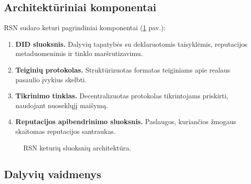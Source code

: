 \documentclass[11pt,a4paper,twocolumn]{article}
\begin{document}
\subsection{Architektūriniai komponentai}

RSN sudaro keturi pagrindiniai komponentai (\ref{fig:architecture} pav.):
\begin{enumerate}[nosep]
\item \textbf{DID sluoksnis.} Dalyvių tapatybės su deklaruotomis taisyklėmis, reputacijos metaduomenimis ir tinklo maršrutizavimu.
\item \textbf{Teiginių protokolas.} Struktūrizuotas formatas teiginiams apie realaus pasaulio įvykius skelbti.
\item \textbf{Tikrinimo tinklas.} Decentralizuotas protokolas tikrintojams priskirti, naudojant nuoseklųjį maišymą.
\item \textbf{Reputacijos apibendrinimo sluoksnis.} Paslaugos, kuriančios žmogaus skaitomas reputacijos santraukas.
\end{enumerate}

\begin{figure}[ht]
\centering
{}
\caption{RSN keturių sluoksnių architektūra.}
\label{fig:architecture}
\end{figure}

\subsection{Dalyvių vaidmenys}
\end{document}

